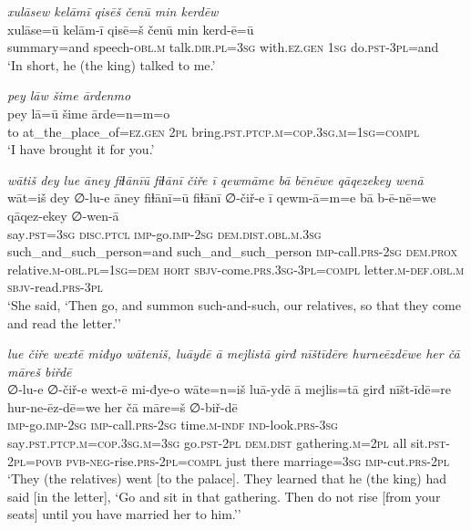 \ea \label{KŠ.83}
\textit{xulāsew kelāmī qisēš čenū min kerdēw} \\ 
\gll xulāse=ū kelām-ī qisē=š čenū min kerd-ē=ū \\ 
 summary=and speech\textsc{-obl}\textsc{.m} talk\textsc{.dir}\textsc{.pl}\textsc{=3sg} with\textsc{\textsc{.ez}.gen} \textsc{1sg} do\textsc{.pst}\textsc{-3pl}=and \\ 
\glt `In short, he (the king) talked to me.'
\z 
 
\ea \label{KŠ.85}
\textit{pey lāw šime ārdenmo} \\ 
\gll pey lā=ū šime ārde=n=m=o \\ 
 to at\_the\_place\_of\textsc{\textsc{=ez.gen}} \textsc{2pl} bring\textsc{.pst}\textsc{.ptcp}\textsc{.m}\textsc{=cop}\textsc{.3sg}\textsc{.m}\textsc{=\textsc{1sg}}\textsc{=compl} \\ 
\glt `I have brought it for you.'
\z 
 
\ea \label{KŠ.86}
\textit{wātiš dey lue āney fiɫānīū fiɫānī čiře ī qewmāme bā bēnēwe qāqezekey wenā} \\ 
\gll wāt=iš dey ∅-lu-e āney fiɫānī=ū fiɫānī ∅-čiř-e ī qewm-ā=m=e bā b-ē-nē=we qāqez-ekey ∅-wen-ā \\ 
 say\textsc{.pst}\textsc{=3sg} \textsc{disc.ptcl} \textsc{imp-}go.\textsc{imp-}\textsc{2sg} \textsc{dem.dist}\textsc{.obl}\textsc{.m}\textsc{.3sg} such\_and\_such\_person=and such\_and\_such\_person \textsc{imp-}call\textsc{.prs}-\textsc{2sg} \textsc{dem.prox} relative\textsc{.m}\textsc{-obl}\textsc{.pl}\textsc{=\textsc{1sg}}\textsc{=dem} \textsc{hort} \textsc{sbjv-}come\textsc{.prs}\textsc{.3sg}\textsc{-3pl}\textsc{=compl} letter\textsc{.m}\textsc{-def}\textsc{.obl}\textsc{.m} \textsc{sbjv-}read\textsc{.prs}\textsc{-3pl} \\ 
\glt `She said, ‘Then go, and summon such-and-such, our relatives, so that they come and read the letter.’'
\z 
 
\ea \label{KŠ.87}
\textit{lue čiře wextē miđyo wāteniš, luāydē ā mejlistā girđ nīštīdēre hurneēzdēwe her čā māreš biřdē} \\ 
\gll ∅-lu-e ∅-čiř-e wext-ē mi-đye-o wāte=n=iš luā-ydē ā mejlis=tā girđ nīšt-īdē=re hur-ne-ēz-dē=we her čā māre=š ∅-biř-dē \\ 
 \textsc{imp-}go.\textsc{imp-}\textsc{2sg} \textsc{imp-}call\textsc{.prs}-\textsc{2sg} time\textsc{.m}\textsc{-indf} \textsc{ind-}look\textsc{.prs}\textsc{-3sg} say\textsc{.pst}\textsc{.ptcp}\textsc{.m}\textsc{=cop}\textsc{.3sg}\textsc{.m}\textsc{=3sg} go\textsc{.pst}-\textsc{2pl} \textsc{dem.dist} gathering\textsc{.m}=\textsc{2pl} all sit\textsc{.pst}-\textsc{2pl}\textsc{=\textsc{povb}} \textsc{pvb-}\textsc{neg-}rise\textsc{.prs}-\textsc{2pl}\textsc{=compl} just there marriage\textsc{=3sg} \textsc{imp-}cut\textsc{.prs}-\textsc{2pl} \\ 
\glt `They (the relatives) went [to the palace]. They learned that he (the king) had said [in the letter], ‘Go and sit in that gathering. Then do not rise [from your seats] until you have married her to him.’'
\z 
 
